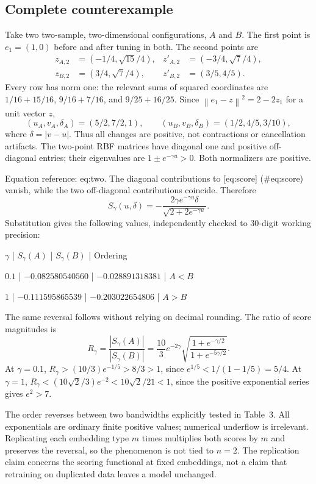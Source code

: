 \documentclass[10pt]{article}
\begin{document}
\subsection*{Complete counterexample}
Take two two-sample, two-dimensional configurations, \(A\) and \(B\). The first point is \(e_1=(1,0)\) before and after tuning in both. The second points are \[\begin{aligned}
z_{A,2}&=(-1/4,\sqrt{15}/4),&
z'_{A,2}&=(-3/4,\sqrt7/4),\\
z_{B,2}&=(3/4,\sqrt7/4),&
z'_{B,2}&=(3/5,4/5).\end{aligned}\] Every row has norm one: the relevant sums of squared coordinates are \(1/16+15/16\), \(9/16+7/16\), and \(9/25+16/25\). Since \(\left\lVert e_1-z\right\rVert^2=2-2z_1\) for a unit vector \(z\), \[(u_A,v_A,\delta_A)=(5/2,7/2,1),\qquad
(u_B,v_B,\delta_B)=(1/2,4/5,3/10),\] where \(\delta=\left|v-u\right|\). Thus all changes are positive, not contractions or cancellation artifacts. The two-point RBF matrices have diagonal one and positive off-diagonal entries; their eigenvalues are \(1\pm e^{-\gamma u}>0\). Both normalizers are positive.\par
Equation reference: eq:two. The diagonal contributions to [eq:score] (\#eq:score) vanish, while the two off-diagonal contributions coincide. Therefore \[
S_\gamma(u,\delta)
=-\frac{2\gamma e^{-\gamma u}\delta}
        {\sqrt{2+2e^{-\gamma u}}}.\] Substitution gives the following values, independently checked to 30-digit working precision:\par
\(\gamma\) | \(S_\gamma(A)\) | \(S_\gamma(B)\) | Ordering\par
\(0.1\) | \(-0.082580540560\) | \(-0.028891318381\) | \(A<B\)\par
\(1\) | \(-0.111595865539\) | \(-0.203022654806\) | \(A>B\)\par
The same reversal follows without relying on decimal rounding. The ratio of score magnitudes is \[R_\gamma=\frac{\left|S_\gamma(A)\right|}{\left|S_\gamma(B)\right|}
=\frac{10}{3}e^{-2\gamma}
 \sqrt{\frac{1+e^{-\gamma/2}}{1+e^{-5\gamma/2}}}.\] At \(\gamma=0.1\), \(R_\gamma>(10/3)e^{-1/5}>8/3>1\), since \(e^{1/5}<1/(1-1/5)=5/4\). At \(\gamma=1\), \(R_\gamma<(10\sqrt2/3)e^{-2}<10\sqrt2/21<1\), since the positive exponential series gives \(e^2>7\).\par
The order reverses between two bandwidths explicitly tested in Table 3. All exponentials are ordinary finite positive values; numerical underflow is irrelevant. Replicating each embedding type \(m\) times multiplies both scores by \(m\) and preserves the reversal, so the phenomenon is not tied to \(n=2\). The replication claim concerns the scoring functional at fixed embeddings, not a claim that retraining on duplicated data leaves a model unchanged.\par
\end{document}
